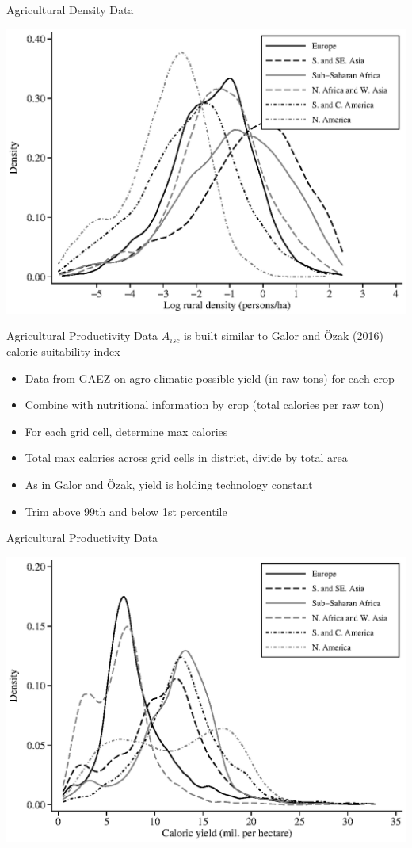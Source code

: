 \documentclass[10pt, xcolor=dvipsnames]{beamer}
\begin{document}
\begin{frame}{Agricultural Density Data}
\begin{center}
\includegraphics[width=.8\textwidth]{fig_dens_rurd.eps}
\end{center}
\end{frame}

\begin{frame}{Agricultural Productivity Data}
$A_{isc}$ is built similar to Galor and {\"O}zak (2016) caloric suitability index
\begin{itemize}
  \item Data from GAEZ on agro-climatic possible yield (in raw tons) for each crop
  \item Combine with nutritional information by crop (total calories per raw ton)
  \item For each grid cell, determine max calories
  \item Total max calories across grid cells in district, divide by total area
  \item As in Galor and {\"O}zak, yield is holding technology constant
  \item Trim above 99th and below 1st percentile
\end{itemize}
\end{frame}

\begin{frame}{Agricultural Productivity Data}
\begin{center}
\includegraphics[width=.8\textwidth]{fig_dens_csi.eps}
\end{center}
\end{frame}
\end{document}
